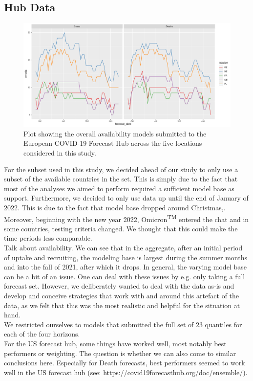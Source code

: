\subsection{Hub Data} \label{sub:hub_data}
\begin{figure}
\includegraphics[width = \textwidth]{../plots/availability_all.pdf}
\caption{Plot showing the overall availability models submitted to the European COVID-19 Forecast Hub across the five locations considered in this study.}
\end{figure}
For the subset used in this study, we decided ahead of our study to only use a subset of the available countries in the set. This is simply due to the fact that most of the analyses we aimed to perform required a sufficient model base as support. Furthermore, we decided to only use data up until the end of January of 2022. This is due to the fact that model base dropped around Christmas,. Moreover, beginning with the new year 2022, Omicron\textsuperscript{TM} entered the chat and in some countries, testing criteria changed. We thought that this could make the time periods less comparable.\\
Talk about availability. We can see that in the aggregate, after an initial period of uptake and recruiting, the modeling base is largest during the summer months and into the fall of 2021, after which it drops.
In general, the varying model base can be a bit of an issue. One can deal with these issues by e.g. only taking a full forecast set. However, we deliberately wanted to deal with the data as-is and develop and conceive strategies that work with and around this artefact of the data, as we felt that this was the most realistic and helpful for the situation at hand. \\
We restricted ourselves to models that submitted the full set of 23 quantiles for each of the four horizons.\\
For the US forecast hub, some things have worked well, most notably best performers or weighting. The question is whether we can also come to similar conclusions here. Especially for Death forecasts, best performers seemed to work well in the US forecast hub (see: https://covid19forecasthub.org/doc/ensemble/).\\
